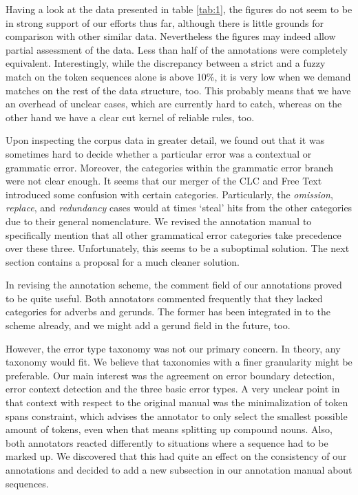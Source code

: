 \documentclass{article}
\begin{document}
Having a look at the data presented in table \ref{tab:1}, the figures do not
seem to be in strong support of our efforts thus far, although there is little
grounds for comparison with other similar data. Nevertheless the figures may
indeed allow partial assessment of the data.  Less than half of the annotations
were completely equivalent. Interestingly, while the discrepancy between a
strict and a fuzzy match on the token sequences alone is above 10\%, it is very
low when we demand matches on the rest of the data structure, too. This probably means
that we have an overhead of unclear cases, which are currently hard to catch,
whereas on the other hand we have a clear cut kernel of reliable rules, too.

Upon inspecting the corpus data in greater detail, we found out that it was
sometimes hard to decide whether a particular error was a contextual or
grammatic error. Moreover, the categories within the grammatic error
branch were not clear enough. It seems that our merger of the CLC and Free Text
introduced some confusion with certain categories. Particularly, the
\textit{omission}, \textit{replace}, and \textit{redundancy} cases would at
times `steal' hits from the other categories due to their general
nomenclature. We revised the annotation manual to specifically mention that
all other grammatical error categories take precedence over these three.
Unfortunately, this seems to be a suboptimal solution. The next section contains
a proposal for a much cleaner solution.

In revising the annotation scheme, the comment field of our annotations proved
to be quite useful. Both annotators commented frequently that they lacked
categories for adverbs and gerunds. The former has been integrated in to the
scheme already, and we might add a gerund field in the future, too.

However, the error type taxonomy was not our primary concern. In theory, any
taxonomy would fit. We believe that taxonomies with a finer granularity might be
preferable. Our main interest was the agreement on error boundary detection,
error context detection and the three basic error types.  A very unclear point
in that context with respect to the original manual was the minimalization of
token spans constraint, which advises the annotator to only select the smallest
possible amount of tokens, even when that means splitting up compound nouns.
Also, both annotators reacted differently to situations where a sequence had to
be marked up. We discovered that this had quite an effect on the consistency of
our annotations and decided to add a new subsection in our annotation manual
about sequences.
\end{document}
